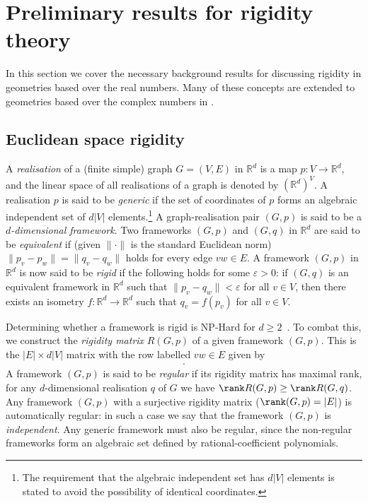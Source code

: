\section{Preliminary results for rigidity theory}\label{sec:prelim}

In this section we cover the necessary background results for discussing rigidity in geometries based over the real numbers.
Many of these concepts are extended to geometries based over the complex numbers in .

\subsection{Euclidean space rigidity}

A \emph{realisation} of a (finite simple) graph $G=(V,E)$ in $\mathbb{R}^d$ is a map $p:V \rightarrow \mathbb{R}^d$,
and the linear space of all realisations of a graph is denoted by $(\mathbb{R}^d)^V$.
A realisation $p$ is said to be \emph{generic} if the set of coordinates of $p$ forms an algebraic independent set of $d|V|$ elements.\footnote{The requirement that the algebraic independent set has $d|V|$ elements is stated to avoid the possibility of identical coordinates.}
A graph-realisation pair $(G,p)$ is said to be a \emph{$d$-dimensional framework}.
Two frameworks $(G,p)$ and $(G,q)$ in $\mathbb{R}^d$ are said to be \emph{equivalent} if (given $\|\cdot\|$ is the standard Euclidean norm) $\|p_v - p_w\| = \|q_v-q_w\|$ holds for every edge $vw \in E$.
A framework $(G,p)$ in $\mathbb{R}^d$ is now said to be \emph{rigid} if the following holds for some $\varepsilon >0$:
if $(G,q)$ is an equivalent framework in $\mathbb{R}^d$ such that $\|p_v-q_w\|<\varepsilon$ for all $v \in V$,
then there exists an isometry $f: \mathbb{R}^d \rightarrow \mathbb{R}^d$ such that $q_v = f(p_v)$ for all $v \in V$.

Determining whether a framework is rigid is NP-Hard for $d \geq 2$~\cite{Abbot}.
To combat this, we construct the \emph{rigidity matrix} $R(G,p)$ of a given framework $(G,p)$.
This is the $|E| \times d|V|$ matrix with the row labelled $vw \in E$ given by
\begin{align*}
	[ 0 \quad \cdots  \quad 0  \quad \overbrace{p_v-p_w}^{v} \quad 0  \quad \cdots  \quad 0  \quad \overbrace{p_w-p_v}^{w} \quad 0  \quad \cdots  \quad 0].
\end{align*}
A framework $(G,p)$ is said to be \emph{regular} if its rigidity matrix has maximal rank,
\ie for any $d$-dimensional realisation $q$ of $G$ we have $\rank R(G,p) \geq \rank R(G,q)$.
Any framework $(G,p)$ with a surjective rigidity matrix (\ie $\rank (G,p)=|E|$) is automatically regular:
in such a case we say that the framework $(G,p)$ is \emph{independent}.
Any generic framework must also be regular, since the non-regular frameworks form an algebraic set defined by rational-coefficient polynomials.


